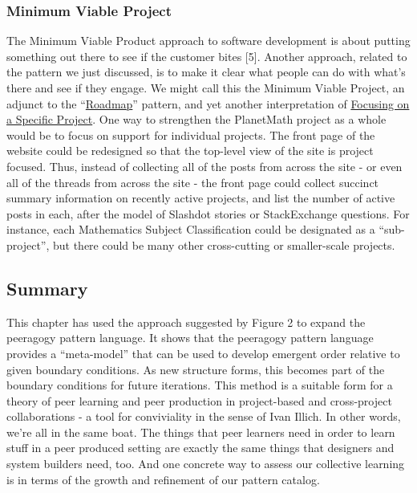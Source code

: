 \subsubsection{Minimum Viable Project}

The Minimum Viable Product approach to software development is about
putting something out there to see if the customer bites {[}5{]}.
Another approach, related to the pattern we just discussed, is to make
it clear what people can do with what's there and see if they engage. We
might call this the Minimum Viable Project, an adjunct to the
``\href{http://peeragogy.org/practice/roadmap/}{Roadmap}'' pattern, and
yet another interpretation of
\href{http://peeragogy.org/practice/focusing-on-a-specific-project/}{Focusing
on a Specific Project}. One way to strengthen the PlanetMath project as
a whole would be to focus on support for individual projects. The front
page of the website could be redesigned so that the top-level view of
the site is project focused. Thus, instead of collecting all of the
posts from across the site - or even all of the threads from across the
site - the front page could collect succinct summary information on
recently active projects, and list the number of active posts in each,
after the model of Slashdot stories or StackExchange questions. For
instance, each Mathematics Subject Classification could be designated as
a ``sub-project'', but there could be many other cross-cutting or
smaller-scale projects.

\subsection{Summary}

This chapter has used the approach suggested by Figure 2 to expand the
peeragogy pattern language. It shows that the peeragogy pattern language
provides a ``meta-model'' that can be used to develop emergent order
relative to given boundary conditions. As new structure forms, this
becomes part of the boundary conditions for future iterations. This
method is a suitable form for a theory of peer learning and peer
production in project-based and cross-project collaborations - a tool
for conviviality in the sense of Ivan Illich. In other words, we're all
in the same boat. The things that peer learners need in order to learn
stuff in a peer produced setting are exactly the same things that
designers and system builders need, too. And one concrete way to assess
our collective learning is in terms of the growth and refinement of our
pattern catalog.

